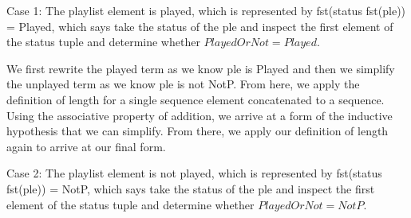 \documentclass[a4paper,10pt,fleqn]{article}
\begin{document}
\bigskip

\noindent Case 1: The playlist element is played, which is represented by fst(status fst(ple)) = Played, which says take the status of the ple and inspect the first element of the status tuple and determine whether $PlayedOrNot = Played$.

\bigskip

\begin{center}
\end{center}
\bigskip

\noindent We first rewrite the played term as we know ple is Played and then we simplify the unplayed term as we know ple is not NotP. From here, we apply the definition of length for a single sequence element concatenated to a sequence. Using the associative property of addition, we arrive at a form of the inductive hypothesis that we can simplify.  From there, we apply our definition of length again to arrive at our final form.

\bigskip

\noindent Case 2: The playlist element is not played, which is represented by fst(status fst(ple)) = NotP, which says take the status of the ple and inspect the first element of the status tuple and determine whether $PlayedOrNot = NotP$.
\end{document}
